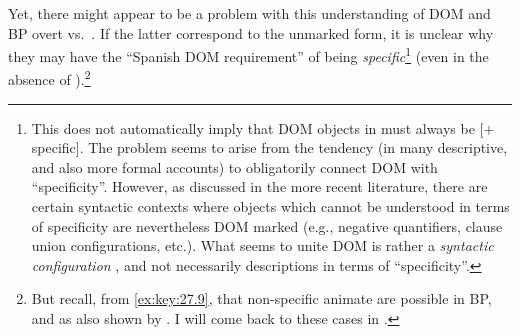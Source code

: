 \documentclass[output=paper]{langsci/langscibook}
\begin{document}
Yet, there might appear to be a problem with this understanding of DOM and
\gls{BP} overt vs.\ . If the latter
correspond to the unmarked form, it is unclear why they may have the ``Spanish
DOM requirement'' of being \emph{specific}\footnote{This does not automatically
    imply that DOM objects in  must always be [$+$specific]. The problem
    seems to arise from the tendency (in many descriptive, and also more formal
    accounts) to obligatorily connect DOM with
    \enquote{specificity}. However, as
    discussed in the more recent literature, there are certain syntactic
    contexts where objects which cannot be understood in terms of specificity
    are nevertheless DOM marked (e.g., negative quantifiers, clause union
configurations, etc.). What seems to unite DOM
is rather a \emph{syntactic configuration} \parencite{Lopez2012}, and not
necessarily descriptions in terms of \enquote{specificity}.}  (even in the
absence of ).\footnote{But recall, from \eqref{ex:key:27.9}, that
    non-specific animate  are possible in
    \gls{BP}, and as also shown by
    \textcite{Cyrino1994,Cyrino1997}. I will come back to these cases in
.}\largerpage[-2]
\end{document}
